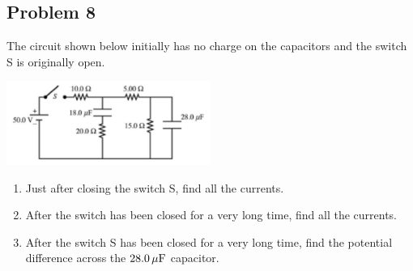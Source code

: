 \subsection*{Problem 8}
The circuit shown below initially has no charge on the capacitors and the switch S is originally open.\\
\centerline{\includegraphics[width=0.5\textwidth]{Images/P8img1.png}}
\begin{enumerate}
    \item Just after closing the switch S, find all the currents.
    \item After the switch has been closed for a very long time,
    find all the currents.
    \item After the switch S has been closed for a very long time,
    find the potential difference across the $28.0\,\mathrm{\mu F}$ capacitor.
\end{enumerate}

